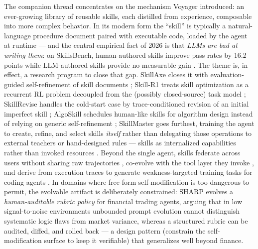 \documentclass[
  11pt,
]{article}
\begin{document}
The companion thread concentrates on the mechanism Voyager
\citep{wang2023voyager} introduced: an ever-growing library of reusable
skills, each distilled from experience, composable into more complex
behavior. In its modern form the ``skill'' is typically a
natural-language procedure document paired with executable code, loaded
by the agent at runtime --- and the central empirical fact of 2026 is
that \emph{LLMs are bad at writing them}: on SkillsBench, human-authored
skills improve pass rates by 16.2 points while LLM-authored skills
provide no measurable gain \citep{gautam2026skillaxe}. The theme is, in
effect, a research program to close that gap. SkillAxe closes it with
evaluation-guided self-refinement of skill documents
\citep{gautam2026skillaxe}; Skill-R1 treats skill optimization as a
recurrent RL problem decoupled from the (possibly closed-source) task
model \citep{vishe2026skill}; SkillRevise handles the cold-start case by
trace-conditioned revision of an initial imperfect skill
\citep{liu2026skillrevise}; AlgoSkill schedules human-like skills for
algorithm design instead of relying on generic self-refinement
\citep{song2026algoskill}; SkillMaster goes furthest, training the agent
to create, refine, and select skills \emph{itself} rather than
delegating those operations to external teachers or hand-designed rules
--- skills as internalized capabilities rather than invoked resources
\citep{yang2026skillmaster}. Beyond the single agent, skills federate
across users without sharing raw trajectories
\citep{yang2026federatedskill}, co-evolve with the tool layer they
invoke \citep{wei2026skillsmith}, and derive from execution traces to
generate weakness-targeted training tasks for coding agents
\citep{xiao2026socratic}. In domains where free-form self-modification
is too dangerous to permit, the evolvable artifact is deliberately
constrained: SHARP evolves a \emph{human-auditable rubric policy} for
financial trading agents, arguing that in low signal-to-noise
environments unbounded prompt evolution cannot distinguish systematic
logic flaws from market variance, whereas a structured rubric can be
audited, diffed, and rolled back \citep{chen2026sharp} --- a design
pattern (constrain the self-modification surface to keep it verifiable)
that generalizes well beyond finance.
\end{document}
